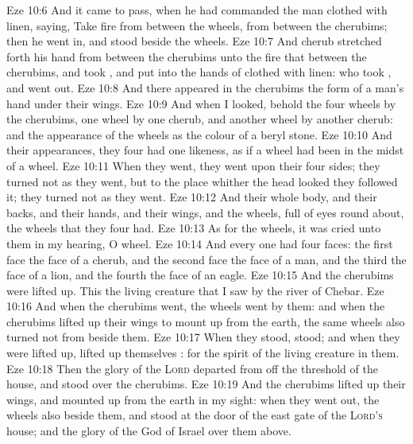 \vs Eze 10:6 And it came to pass,  when he had commanded the man clothed with linen, saying, Take fire from between the wheels, from between the cherubims; then he went in, and stood beside the wheels.
\vs Eze 10:7 And  cherub stretched forth his hand from between the cherubims unto the fire that  between the cherubims, and took , and put  into the hands of  clothed with linen: who took , and went out.
\vs Eze 10:8 And there appeared in the cherubims the form of a man's hand under their wings.
\vs Eze 10:9 And when I looked, behold the four wheels by the cherubims, one wheel by one cherub, and another wheel by another cherub: and the appearance of the wheels  as the colour of a beryl stone.
\vs Eze 10:10 And  their appearances, they four had one likeness, as if a wheel had been in the midst of a wheel.
\vs Eze 10:11 When they went, they went upon their four sides; they turned not as they went, but to the place whither the head looked they followed it; they turned not as they went.
\vs Eze 10:12 And their whole body, and their backs, and their hands, and their wings, and the wheels,  full of eyes round about,  the wheels that they four had.
\vs Eze 10:13 As for the wheels, it was cried unto them in my hearing, O wheel.
\vs Eze 10:14 And every one had four faces: the first face  the face of a cherub, and the second face  the face of a man, and the third the face of a lion, and the fourth the face of an eagle.
\vs Eze 10:15 And the cherubims were lifted up. This  the living creature that I saw by the river of Chebar.
\vs Eze 10:16 And when the cherubims went, the wheels went by them: and when the cherubims lifted up their wings to mount up from the earth, the same wheels also turned not from beside them.
\vs Eze 10:17 When they stood,  stood; and when they were lifted up,  lifted up themselves : for the spirit of the living creature  in them.
\vs Eze 10:18 Then the glory of the \textsc{Lord} departed from off the threshold of the house, and stood over the cherubims.
\vs Eze 10:19 And the cherubims lifted up their wings, and mounted up from the earth in my sight: when they went out, the wheels also  beside them, and  stood at the door of the east gate of the \textsc{Lord's} house; and the glory of the God of Israel  over them above.
